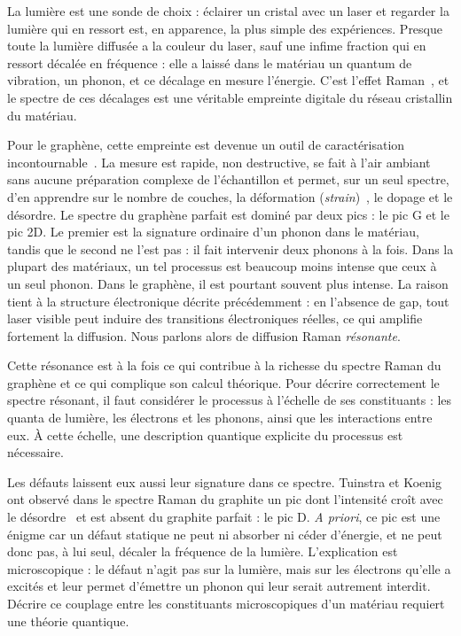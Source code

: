 
La lumière est une sonde de choix : éclairer un cristal avec un laser et regarder la lumière qui en ressort est, en apparence, la plus simple des expériences. Presque toute la lumière diffusée a la couleur du laser, sauf une infime fraction qui en ressort décalée en fréquence : elle a laissé dans le matériau un quantum de vibration, un phonon, et ce décalage en mesure l'énergie. C'est l'effet Raman~\cite{ramanNewTypeSecondary1928}, et le spectre de ces décalages est une véritable empreinte digitale du réseau cristallin du matériau.

Pour le graphène, cette empreinte est devenue un outil de caractérisation incontournable~\cite{ferrariRamanSpectrumGraphene2006,ferrariRamanSpectroscopyVersatile2013a}. La mesure est rapide, non destructive, se fait à l'air ambiant sans aucune préparation complexe de l'échantillon et permet, sur un seul spectre, d'en apprendre sur le nombre de couches, la déformation (\textit{strain})~\cite{mohiuddinUniaxialStrainGraphene2009}, le dopage et le désordre. Le spectre du graphène parfait est dominé par deux pics : le pic G et le pic 2D. Le premier est la signature ordinaire d'un phonon dans le matériau, tandis que le second ne l'est pas : il fait intervenir deux phonons à la fois. Dans la plupart des matériaux, un tel processus est beaucoup moins intense que ceux à un seul phonon. Dans le graphène, il est pourtant souvent plus intense. La raison tient à la structure électronique décrite précédemment : en l'absence de gap, tout laser visible peut induire des transitions électroniques réelles, ce qui amplifie fortement la diffusion. Nous parlons alors de diffusion Raman \textit{résonante}.

Cette résonance est à la fois ce qui contribue à la richesse du spectre Raman du graphène et ce qui complique son calcul théorique. Pour décrire correctement le spectre résonant, il faut considérer le processus à l'échelle de ses constituants : les quanta de lumière, les électrons et les phonons, ainsi que les interactions entre eux. À cette échelle, une description quantique explicite du processus est nécessaire.

Les défauts laissent eux aussi leur signature dans ce spectre. Tuinstra et Koenig ont observé dans le spectre Raman du graphite un pic dont l'intensité croît avec le désordre~\cite{tuinstraRamanSpectrumGraphite1970} et est absent du graphite parfait : le pic D. \textit{A priori}, ce pic est une énigme car un défaut statique ne peut ni absorber ni céder d'énergie, et ne peut donc pas, à lui seul, décaler la fréquence de la lumière. L'explication est microscopique : le défaut n'agit pas sur la lumière, mais sur les électrons qu'elle a excités et leur permet d'émettre un phonon qui leur serait autrement interdit. Décrire ce couplage entre les constituants microscopiques d'un matériau requiert une théorie quantique.

